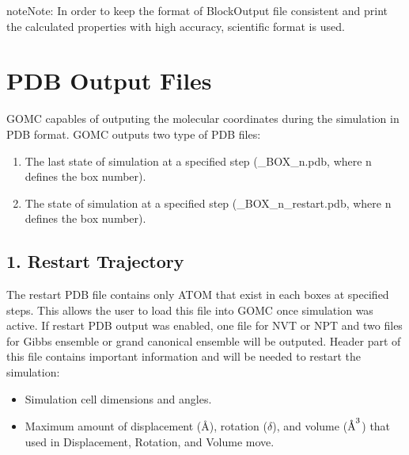 \documentclass[letterpaper,10pt,english]{sphinxmanual}
\begin{document}
\begin{sphinxadmonition}{note}{Note:}
\sphinxAtStartPar
In order to keep the format of BlockOutput file consistent and print the calculated properties
with high accuracy, scientific format is used.
\end{sphinxadmonition}


\section{PDB Output Files}
\label{\detokenize{output_file:pdb-output-files}}
\sphinxAtStartPar
GOMC capables of outputing the molecular coordinates during the simulation in PDB format.
GOMC outputs two type of PDB files:
\begin{enumerate}
%
\item {} 
\sphinxAtStartPar
The last state of simulation at a specified step (\_BOX\_n.pdb,
where n defines the box number).

\item {} 
\sphinxAtStartPar
The state of simulation at a specified step (\_BOX\_n\_restart.pdb,
where n defines the box number).

\end{enumerate}


\subsection{1.  Restart Trajectory}
\label{\detokenize{output_file:restart-trajectory}}
\sphinxAtStartPar
The restart PDB file contains only ATOM that exist in each boxes at specified steps. This allows the
user to load this file into GOMC once  simulation was active. If restart PDB output was enabled,
one file for NVT or NPT and two files for Gibbs ensemble or grand canonical ensemble will be outputed.
Header part of this file contains important information and will be needed to restart the simulation:
\begin{itemize}
\item {} 
\sphinxAtStartPar
Simulation cell dimensions and angles.

\item {} 
\sphinxAtStartPar
Maximum amount of displacement (Å), rotation (\(\delta\)), and volume (\(\AA^3\)) that used in Displacement,
Rotation, and Volume move.

\end{itemize}
\end{document}
